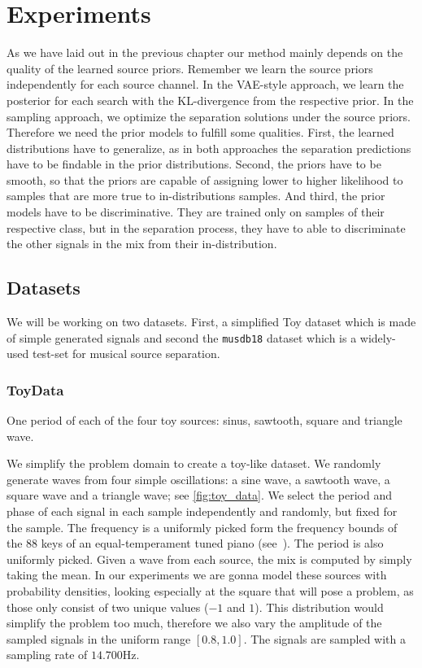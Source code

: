 \chapter{Experiments}%
\label{ch:experiments}%
%
As we have laid out in the previous chapter our method mainly depends on the quality of the learned source priors. Remember we learn the source priors independently for each source channel. In the VAE-style approach, we learn the posterior for each search with the KL-divergence from the respective prior. In the sampling approach, we optimize the separation solutions under the source priors. Therefore we need the prior models to fulfill some qualities. First, the learned distributions have to generalize, as in both approaches the separation predictions have to be findable in the prior distributions. Second, the priors have to be smooth, so that the priors are capable of assigning lower to higher likelihood to samples that are more true to in-distributions samples. And third, the prior models have to be discriminative. They are trained only on samples of their respective class, but in the separation process, they have to able to discriminate the other signals in the mix from their in-distribution.

\section{Datasets}
We will be working on two datasets. First, a simplified Toy dataset which is made of simple generated signals and second the \texttt{musdb18} dataset which is a widely-used test-set for musical source separation.

\subsection{ToyData}
\begin{marginfigure}[5em]
    \resizebox{\textwidth}{!}{%
    }%
    \caption{One period of each of the four toy sources: sinus, sawtooth, square and triangle wave.}%
    \label{fig:toy_data}
\end{marginfigure}

We simplify the problem domain to create a toy-like dataset. We randomly generate waves from four simple oscillations: a sine wave, a sawtooth wave, a square wave and a triangle wave; see \cref{fig:toy_data}.  We select the period and phase of each signal in each sample independently and randomly, but fixed for the sample. The frequency is a uniformly picked form the frequency bounds of the 88 keys of an equal-temperament tuned piano (see~). The period is also uniformly picked. Given a wave from each source, the mix is computed by simply taking the mean. In our experiments we are gonna model these sources with probability densities, looking especially at the square that will pose a problem, as those only consist of two unique values (\(-1\) and \(1\)). This distribution would simplify the problem too much, therefore we also vary the amplitude of the sampled signals in the uniform range \([0.8, 1.0]\). The signals are sampled with a sampling rate of \(14.700 \si{\Hz}\).

